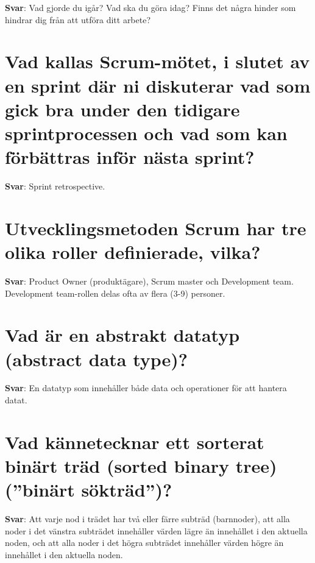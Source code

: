 \documentclass[a4paper,11pt,oneside]{book}
\begin{document}
\begin{sloppypar}
\label{q:248:sa:sv:True}

\textbf{Svar}: Vad gjorde du ig\r{a}r? Vad ska du g\"ora idag? Finns det n\r{a}gra hinder som hindrar dig fr\r{a}n att utf\"ora ditt arbete?



\section{Vad kallas Scrum-m\"otet, i slutet av en sprint d\"ar ni diskuterar vad som gick bra under den tidigare sprintprocessen och vad som kan f\"orb\"attras inf\"or n\"asta sprint?}

\label{q:249:sa:sv:True}

\textbf{Svar}: Sprint retrospective.



\section{Utvecklingsmetoden Scrum har tre olika roller definierade, vilka?}

\label{q:250:sa:sv:True}

\textbf{Svar}: Product Owner (produkt\"agare), Scrum master och Development team. Development team-rollen delas ofta av flera (3-9) personer.



\section{Vad \"ar en abstrakt datatyp (abstract data type)?}

\label{q:251:sa:sv:True}

\textbf{Svar}: En datatyp som inneh\r{a}ller b\r{a}de data och operationer f\"or att hantera datat.



\section{Vad k\"annetecknar ett sorterat bin\"art tr\"ad (sorted binary tree) ({\textquotedblright}bin\"art s\"oktr\"ad{\textquotedblright})?}

\label{q:252:sa:sv:True}

\textbf{Svar}: Att varje nod i tr\"adet har tv\r{a} eller f\"arre subtr\"ad (barnnoder), att alla noder i det v\"anstra subtr\"adet inneh\r{a}ller v\"arden l\"agre \"an inneh\r{a}llet i den aktuella noden, och att alla noder i det h\"ogra subtr\"adet inneh\r{a}ller v\"arden h\"ogre \"an inneh\r{a}llet i den aktuella noden.




\end{sloppypar}
\end{document}
